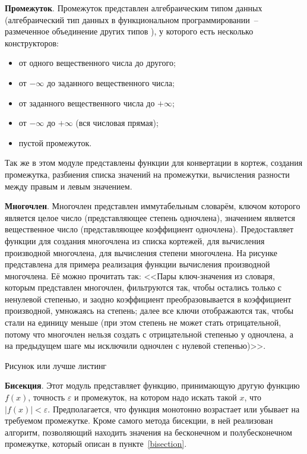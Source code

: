 \textbf{Промежуток}. Промежуток представлен алгебраическим типом данных
(алгебраический тип данных в функциональном программировании~-- размеченное объединение
других типов \cite{fprog-adt}),
у которого есть несколько конструкторов:

\begin{itemize}
    \item от одного вещественного числа до другого;
    \item от \(-\infty\) до заданного вещественного числа;
    \item от заданного вещественного числа до \(+\infty\);
    \item от \(-\infty\) до \(+\infty\) (вся числовая прямая);
    \item пустой промежуток.
\end{itemize}

Так же в этом модуле представлены функции для конвертации в кортеж, создания промежутка,
разбиения списка значений на промежутки, вычисления разности между правым и левым значением.

\textbf{Многочлен}. Многочлен представлен иммутабельным словарём, ключом которого является целое число (представляющее степень одночлена),
значением является вещественное число (представляющее коэффициент одночлена).
Предоставляет функции для создания многочлена из списка кортежей, для вычисления производной многочлена, для вычисления степени многочлена.
На рисунке \TODO представлена для примера реализация функции вычисления производной многочлена. Её можно прочитать так:
<<Пары ключ-значения из словаря, которым представлен многочлен, фильтруются так, чтобы остались только с ненулевой степенью,
и заодно коэффициент преобразовывается в коэффициент производной, умножаясь на степень; далее все ключи отображаются так, чтобы стали на единицу меньше
(при этом степень не может стать отрицательной, потому что многочлен нельзя создать с отрицательной степенью у одночлена,
а на предыдущем шаге мы исключили одночлен с нулевой степенью)>>.

\TODO Рисунок или лучше листинг

\textbf{Бисекция}. Этот модуль представляет функцию, принимающую другую функцию \(f(x)\), точность \(\varepsilon\)
и промежуток, на котором надо искать такой \(x\), что \(\left|f(x)\right| < \varepsilon\). Предполагается, что
функция монотонно возрастает или убывает на требуемом промежутке. Кроме самого метода бисекции, в ней реализован алгоритм,
позволяющий находить значения на бесконечном и полубесконечном промежутке, который описан в пункте~\ref{bisection}.

